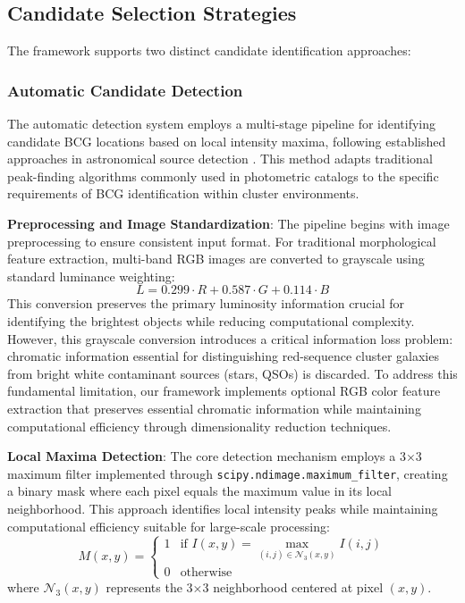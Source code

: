 \documentclass[twocolumn,10pt]{aastex631}
\begin{document}
\subsection{Candidate Selection Strategies}

The framework supports two distinct candidate identification approaches:

\subsubsection{Automatic Candidate Detection}

The automatic detection system employs a multi-stage pipeline for identifying candidate BCG locations based on local intensity maxima, following established approaches in astronomical source detection \citep{Bertin1996}. This method adapts traditional peak-finding algorithms commonly used in photometric catalogs to the specific requirements of BCG identification within cluster environments.

\textbf{Preprocessing and Image Standardization}: The pipeline begins with image preprocessing to ensure consistent input format. For traditional morphological feature extraction, multi-band RGB images are converted to grayscale using standard luminance weighting:
\begin{equation}
L = 0.299 \cdot R + 0.587 \cdot G + 0.114 \cdot B
\end{equation}
This conversion preserves the primary luminosity information crucial for identifying the brightest objects while reducing computational complexity. However, this grayscale conversion introduces a critical information loss problem: chromatic information essential for distinguishing red-sequence cluster galaxies from bright white contaminant sources (stars, QSOs) is discarded. To address this fundamental limitation, our framework implements optional RGB color feature extraction that preserves essential chromatic information while maintaining computational efficiency through dimensionality reduction techniques.

\textbf{Local Maxima Detection}: The core detection mechanism employs a 3×3 maximum filter implemented through \texttt{scipy.ndimage.maximum\_filter}, creating a binary mask where each pixel equals the maximum value in its local neighborhood. This approach identifies local intensity peaks while maintaining computational efficiency suitable for large-scale processing:
\begin{equation}
M(x,y) = \begin{cases} 
1 & \text{if } I(x,y) = \max_{(i,j) \in \mathcal{N}_3(x,y)} I(i,j) \\
0 & \text{otherwise}
\end{cases}
\end{equation}
where $\mathcal{N}_3(x,y)$ represents the 3×3 neighborhood centered at pixel $(x,y)$.
\end{document}
